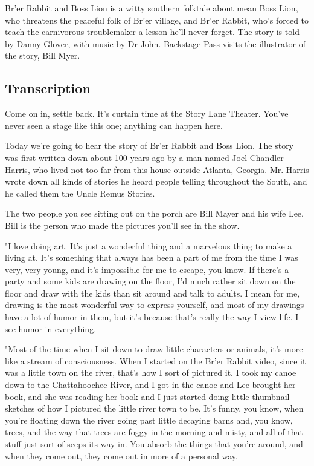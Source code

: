 Br'er Rabbit and Boss Lion is a witty southern folktale about mean Boss Lion, who threatens the peaceful folk of Br'er village, and Br'er Rabbit, who's forced to teach the carnivorous troublemaker a lesson he'll never forget. The story is told by Danny Glover, with music by Dr John. Backstage Pass visits the illustrator of the story, Bill Myer.

\subsection{Transcription}

Come on in, settle back. It's curtain time at the Story Lane Theater. You've never seen a stage like this one; anything can happen here.

Today we're going to hear the story of Br'er Rabbit and Boss Lion. The story was first written down about 100 years ago by a man named Joel Chandler Harris, who lived not too far from this house outside Atlanta, Georgia. Mr. Harris wrote down all kinds of stories he heard people telling throughout the South, and he called them the Uncle Remus Stories.

The two people you see sitting out on the porch are Bill Mayer and his wife Lee. Bill is the person who made the pictures you'll see in the show.

"I love doing art. It's just a wonderful thing and a marvelous thing to make a living at. It's something that always has been a part of me from the time I was very, very young, and it's impossible for me to escape, you know. If there's a party and some kids are drawing on the floor, I'd much rather sit down on the floor and draw with the kids than sit around and talk to adults. I mean for me, drawing is the most wonderful way to express yourself, and most of my drawings have a lot of humor in them, but it's because that's really the way I view life. I see humor in everything.

"Most of the time when I sit down to draw little characters or animals, it's more like a stream of consciousness. When I started on the Br'er Rabbit video, since it was a little town on the river, that's how I sort of pictured it. I took my canoe down to the Chattahoochee River, and I got in the canoe and Lee brought her book, and she was reading her book and I just started doing little thumbnail sketches of how I pictured the little river town to be. It's funny, you know, when you're floating down the river going past little decaying barns and, you know, trees, and the way that trees are foggy in the morning and misty, and all of that stuff just sort of seeps its way in. You absorb the things that you're around, and when they come out, they come out in more of a personal way.

